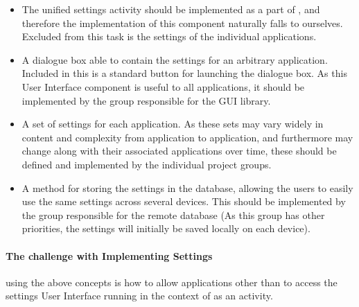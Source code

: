 \begin{itemize}
	\item The unified settings activity should be implemented as a part of \launcher, and therefore the implementation of this component naturally falls to ourselves. 
	Excluded from this task is the settings of the individual applications.
	\item A dialogue box able to contain the settings for an arbitrary \giraf application. Included in this is a standard button for launching the dialogue box. 
	As this User Interface component is useful to all applications, it should be implemented by the group responsible for the \giraf GUI library.
	\item A set of settings for each \giraf application.
	As these sets may vary widely in content and complexity from application to application, and furthermore may change along with their associated applications over time, these should be defined and implemented by the individual project groups. 
	\item A method for storing the settings in the database, allowing the users to easily use the same settings across several devices. This should be implemented by the group responsible for the remote database (As this group has other priorities, the settings will initially be saved locally on each device).
\end{itemize}

\paragraph{The challenge with Implementing Settings} using the above concepts is how to allow applications other than \launcher to access the settings User Interface running in the context of \launcher as an activity.

